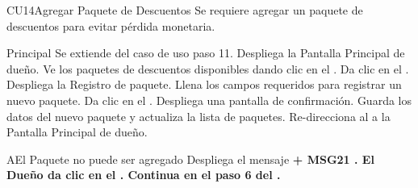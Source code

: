 \begin{UseCase}{CU14}{Agregar Paquete de Descuentos}{
		Se requiere agregar un paquete de descuentos para evitar pérdida monetaria.
	}
	\end{UseCase}
	\begin{UCtrayectoria}{Principal}
		\UCpaso Se extiende del caso de uso  paso 11.
		\UCpaso Despliega la  {Pantalla Principal de dueño}.
		\UCpaso[\UCactor] Ve los paquetes de descuentos disponibles dando clic en el .
		\UCpaso[\UCactor] Da clic en el  .
		\UCpaso Despliega la  {Registro de paquete}.
		\UCpaso [\UCactor] Llena los campos requeridos para registrar un nuevo paquete. 
		\UCpaso[\UCactor] Da clic en el  .
		\UCpaso Despliega una pantalla de confirmación. 
		\UCpaso Guarda los datos del nuevo paquete y actualiza la lista de paquetes.
		\UCpaso Re-direcciona al \UCactor a la  {Pantalla Principal de dueño}.
	\end{UCtrayectoria}


		\begin{UCtrayectoriaA}{A}{El Paquete no puede ser agregado}
			\UCpaso Despliega el mensaje \bf {+ MSG21 }  .
			\UCpaso[\UCactor] El Dueño da clic en el .
			\UCpaso Continua en el paso 6 del .
		\end{UCtrayectoriaA}

